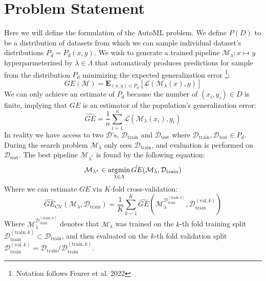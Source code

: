 \documentclass{article}
\DeclareMathOperator*{\argmin}{\arg\!\min}
\begin{document}
\section{Problem Statement} 
Here we will define the formulation of the AutoML problem. We define $P(D)$ to be a distribution of datasets from which we can sample individual dataset's distributions $P_d = P_d (x, y)$. We wish to generate a trained pipeline $\mathcal{M}_\lambda: x \mapsto y$ hyperparmeterized by $\lambda \in \Lambda$ that automaticaly produces predictions for sample from the distribution $P_d$ minimizing the expected generalization error \footnote{Notation follows Feurer et al. 2022}: 
\begin{equation} 
GE(\mathcal{M}) = \mathbf{E}_{(x, y) \in P_d} [\mathcal{L}(\mathcal{M}_{\lambda}(x), y)]
\end{equation}
We can only achieve an estimate of $P_d$ because the number of $(x_i, y_i) \in D$ is finite, implying that $GE$ is an estimator of the population's generalization error: 
\begin{equation}
    \hat{GE} = \frac{1}{n} \sum\limits_{i = 1}^n \mathcal{L}(\mathcal{M}_\lambda (x_i), y_i)
\end{equation}
In reality we have access to two $\mathcal{D}$'s, $\mathcal{D}_{\text{train}}$ and $\mathcal{D}_{\text{test}}$ where $\mathcal{D}_{\text{train}}, \mathcal{D}_{\text{test}} \in P_d$. During the search problem $\mathcal{M}_\lambda$ only sees $\mathcal{D}_{\text{train}}$, and evaluation is performed on $\mathcal{D}_{\text{test}}$. The best pipeline $\mathcal{M}_{\lambda^*}$ is found by the following equation: 
\begin{equation}
    \mathcal{M}_{\lambda ^*} \in \argmin\limits_{\lambda \in \Lambda} \Hat{GE}(\mathcal{M}_\lambda, \mathcal{D}_{\text{train}})
\end{equation}
Where we can estimate $GE$ via $K$-fold cross-validation: 
\begin{equation} 
    \hat{GE}_{\text{CV}}(\mathcal{M}_\lambda, \mathcal{D}_{\text{train}}) = \frac{1}{K} \sum\limits_{k=1}^K \hat{GE}(\mathcal{M}_\lambda^{\mathcal{D}_{\text{train}}^{(\text{train}, k)}}, \mathcal{D}_{\text{train}}^{(\text{val}, k)})
\end{equation}
Where $\mathcal{M}_\lambda^{\mathcal{D}_{\text{train}}^{(\text{train}, k)}}$ denotes that $\mathcal{M}_\lambda$ was trained on the $k$-th fold training split $\mathcal{D}_{\text{train}}^{(\text{train}, k)} \subset \mathcal{D}_{\text{train}}$, and then evaluated on the $k$-th fold validation split $\mathcal{D}_{\text{train}}^{(\text{val}, k)} = \mathcal{D}_{\text{train}} / \mathcal{D}_{\text{train}}^{(\text{train}, k)}$. 
\end{document}
